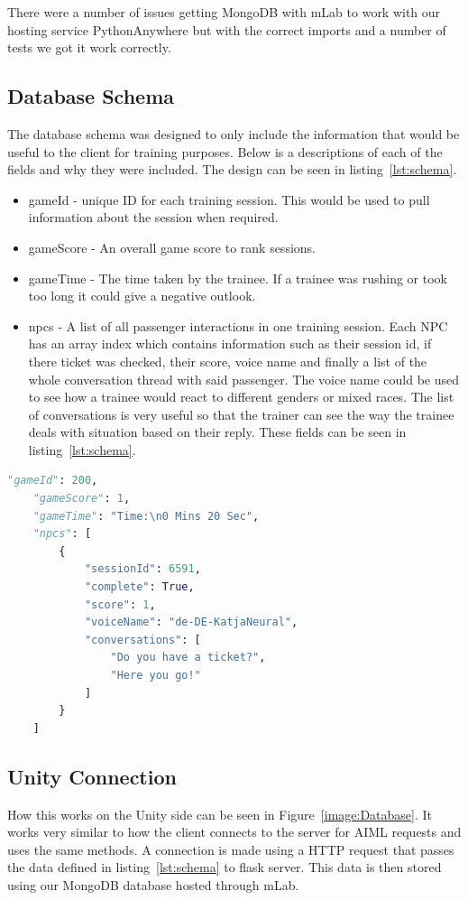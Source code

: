 There were a number of issues getting MongoDB with mLab to work with our hosting service PythonAnywhere but with the correct imports and a number of tests we got it work correctly.

\subsection{Database Schema}
The database schema was designed to only include the information that would be useful to the client for training purposes. Below is a descriptions of each of the fields and why they were included. The design can be seen in listing~\ref{lst:schema}.

\begin{itemize}
  \item gameId - unique ID for each training session. This would be used to pull information about the session when required.
  \item gameScore - An overall game score to rank sessions.
  \item gameTime - The time taken by the trainee. If a trainee was rushing or took too long it could give a negative outlook.
  \item npcs - A list of all passenger interactions in one training session. Each NPC has an array index which contains information such as their session id, if there ticket was checked, their score, voice name and finally a list of the whole conversation thread with said passenger. The voice name could be used to see how a trainee would react to different genders or mixed races. The list of conversations is very useful so that the trainer can see the way the trainee deals with situation based on their reply. These fields can be seen in listing~\ref{lst:schema}. 
\end{itemize}

\newpage
\begin{lstlisting}[caption={MongoDB database schema},label={lst:schema},language=python]
    "gameId": 200,
    "gameScore": 1,
    "gameTime": "Time:\n0 Mins 20 Sec",
    "npcs": [
        {
            "sessionId": 6591,
            "complete": True,
            "score": 1,
            "voiceName": "de-DE-KatjaNeural",
            "conversations": [
                "Do you have a ticket?",
                "Here you go!"
            ]
        }
    ]
\end{lstlisting}

\subsection{Unity Connection}
How this works on the Unity side can be seen in Figure~\ref{image:Database}. It works very similar to how the client connects to the server for AIML requests and uses the same methods. A connection is made using a HTTP request that passes the data defined in listing~\ref{lst:schema} to flask server. This data is then stored using our MongoDB database hosted through mLab.

